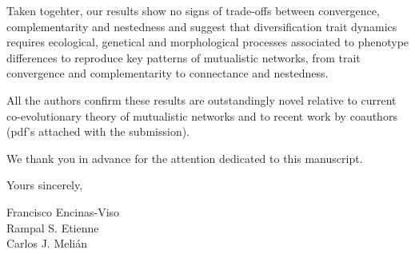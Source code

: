 \documentclass[pdftex]{nature}
\begin{document}
Taken togehter, our results show no signs of trade-offs between
convergence, complementarity and nestedness and suggest that
diversification trait dynamics requires ecological, genetical and
morphological processes associated to phenotype differences to
reproduce key patterns of mutualistic networks, from trait convergence
and complementarity to connectance and nestedness.

All the authors confirm these results are outstandingly novel relative
to current co-evolutionary theory of mutualistic networks and to
recent work by coauthors (pdf's attached with the submission).

\noindent
We thank you in advance for the attention dedicated to this
manuscript.


\noindent
Yours sincerely,

\noindent
Francisco Encinas-Viso\\
Rampal S. Etienne\\
Carlos J. Meli\'an\\

\baselineskip 24pt
\parskip 12pt
\end{document}
